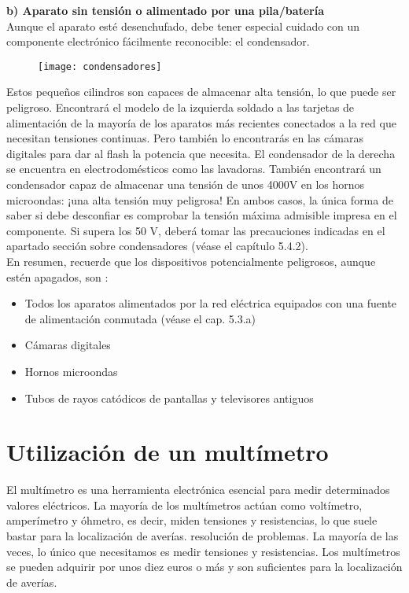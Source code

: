 \textbf{b) Aparato sin tensión o alimentado por una pila/batería}\\
Aunque el aparato esté desenchufado, debe tener especial cuidado con
un componente electrónico fácilmente reconocible: el condensador.
\begin{figure}[h]
\texttt{[image: condensadores]} 
\centering
\end{figure}

Estos pequeños cilindros son capaces de almacenar alta tensión, lo que puede ser
peligroso.
Encontrará el modelo de la izquierda soldado a las tarjetas de alimentación de la mayoría de los aparatos más recientes conectados a la red que necesitan tensiones continuas. Pero también lo encontrarás en las cámaras digitales para dar al flash la potencia que necesita. El condensador de la derecha se encuentra en electrodomésticos como las lavadoras. También encontrará un condensador capaz de almacenar una tensión de unos 4000V en los hornos microondas: ¡una alta tensión muy peligrosa!
En ambos casos, la única forma de saber si debe desconfiar es
comprobar la tensión máxima admisible impresa en el componente.
Si supera los 50 V, deberá tomar las precauciones indicadas en el apartado
sección sobre condensadores (véase el capítulo 5.4.2).\\

En resumen, recuerde que los dispositivos potencialmente peligrosos, aunque estén apagados, son :
\begin{itemize}
\item Todos los aparatos alimentados por la red eléctrica equipados con una fuente de alimentación conmutada (véase el cap. 5.3.a)
\item Cámaras digitales
\item Hornos microondas
\item Tubos de rayos catódicos de pantallas y televisores antiguos
\end{itemize}
\newpage

\section{Utilización de un multímetro}
El multímetro es una herramienta electrónica esencial para medir
determinados valores eléctricos. La mayoría de los multímetros actúan como
voltímetro, amperímetro y óhmetro, es decir, miden tensiones
y resistencias, lo que suele bastar para la localización de averías.
resolución de problemas. La mayoría de las veces, lo único que necesitamos es medir tensiones y resistencias. Los multímetros se pueden adquirir por unos diez euros o más y son suficientes para la localización de averías.

